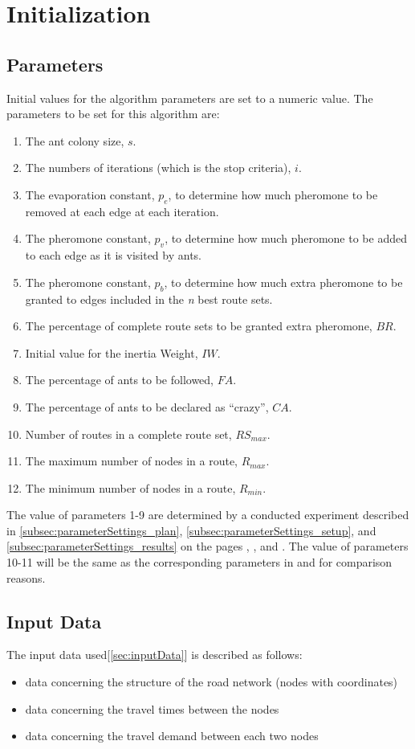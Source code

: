 \section{Initialization}
\subsection{Parameters}
Initial values for the algorithm parameters are set to a numeric value. The parameters to be set for this algorithm are:
\begin{enumerate}
\item The ant colony size, $s$. 
\item The numbers of iterations (which is the stop criteria), $i$.
\item The evaporation constant, $p_e$, to determine how much pheromone to be removed at each edge at each iteration.
\item The pheromone constant, $p_v$, to determine how much pheromone to be added to each edge as it is visited by ants.
\item The pheromone constant, $p_b$, to determine how much extra pheromone to be granted to edges included in the \textit{n} best route sets.
\item The percentage of complete route sets to be granted extra pheromone, $BR$.
\item Initial value for the inertia Weight, $IW$.
\item The percentage of ants to be followed, $FA$.
\item The percentage of ants to be declared as ``crazy'', $CA$.
\item Number of routes in a complete route set, $RS_{max}$. 
\item The maximum number of nodes in a route, $R_{max}$.
\item The minimum number of nodes in a route, $R_{min}$.
\end{enumerate}
The value of parameters 1-9 are determined by a conducted experiment described in \ref{subsec:parameterSettings_plan}, \ref{subsec:parameterSettings_setup}, and \ref{subsec:parameterSettings_results} on the pages \pageref{subsec:parameterSettings_plan}, \pageref{subsec:parameterSettings_setup}, and \pageref{subsec:parameterSettings_results}. The value of parameters 10-11 will be the same as the corresponding parameters in \citet{kechagiopoulos14} and \citet{nikolic14} for comparison reasons. 

\subsection{Input Data}
The input data used[\ref{sec:inputData}] is described as follows:
\begin{itemize}
\item data concerning the structure of the road network (nodes with coordinates)
\item data concerning the travel times between the nodes 
\item data concerning the travel demand between each two nodes
\end{itemize}

